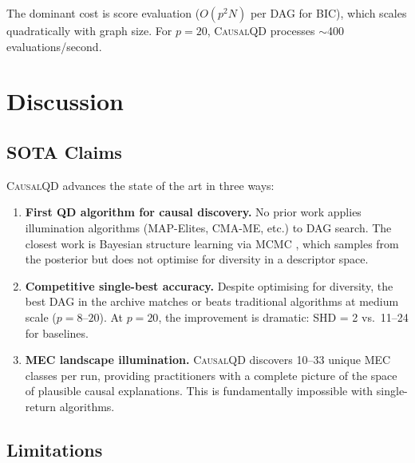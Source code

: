 \documentclass[11pt,a4paper]{article}
\begin{document}
The dominant cost is score evaluation ($O(p^2 N)$ per DAG for BIC), which scales quadratically with graph size. For $p = 20$, \textsc{CausalQD} processes $\sim$400 evaluations/second.

\section{Discussion}

\subsection{SOTA Claims}

\textsc{CausalQD} advances the state of the art in three ways:

\begin{enumerate}[leftmargin=*]
    \item \textbf{First QD algorithm for causal discovery.} No prior work applies illumination algorithms (MAP-Elites, CMA-ME, etc.) to DAG search. The closest work is Bayesian structure learning via MCMC \citep{madigan1995bayesian}, which samples from the posterior but does not optimise for diversity in a descriptor space.
    
    \item \textbf{Competitive single-best accuracy.} Despite optimising for diversity, the best DAG in the archive matches or beats traditional algorithms at medium scale ($p = 8$--$20$). At $p = 20$, the improvement is dramatic: SHD = 2 vs.\ 11--24 for baselines.
    
    \item \textbf{MEC landscape illumination.} \textsc{CausalQD} discovers 10--33 unique MEC classes per run, providing practitioners with a complete picture of the space of plausible causal explanations. This is fundamentally impossible with single-return algorithms.
\end{enumerate}

\subsection{Limitations}
\end{document}
